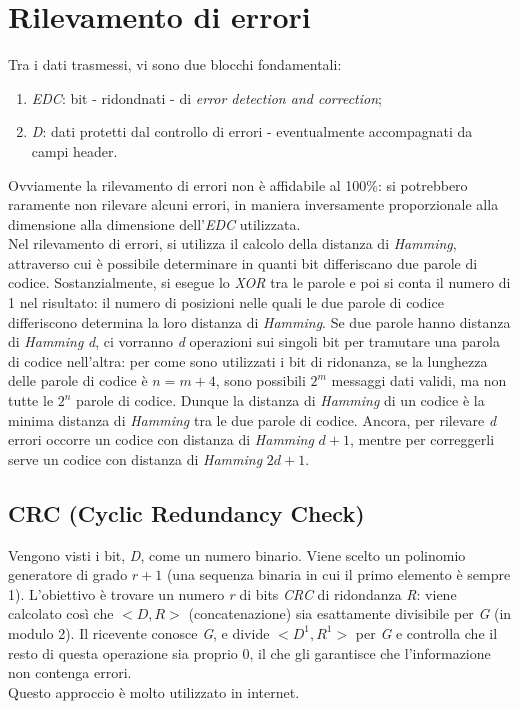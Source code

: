\section{Rilevamento di errori}
Tra i dati trasmessi, vi sono due blocchi fondamentali:
\begin{enumerate}
	\item \textit{EDC}: bit - ridondnati - di \textit{error detection and correction};
	\item \textit{D}: dati protetti dal controllo di errori - eventualmente accompagnati da campi header.
\end{enumerate}
Ovviamente la rilevamento di errori non è affidabile al 100\%: si potrebbero raramente non rilevare alcuni errori, in maniera inversamente proporzionale alla dimensione alla dimensione dell'\textit{EDC} utilizzata. \\
Nel rilevamento di errori, si utilizza il calcolo della distanza di \textit{Hamming}, attraverso cui è possibile determinare in quanti bit differiscano due parole di codice. Sostanzialmente, si esegue lo \textit{XOR} tra le parole e poi si conta il numero di 1 nel risultato: il numero di posizioni nelle quali le due parole di codice differiscono determina la loro distanza di \textit{Hamming}. Se due parole hanno distanza di \textit{Hamming} \textit{d}, ci vorranno \textit{d} operazioni sui singoli bit per tramutare una parola di codice nell'altra: per come sono utilizzati i bit di ridonanza, se la lunghezza delle parole di codice è $n=m+4$, sono possibili $2^m$ messaggi dati validi, ma non tutte le $2^n$ parole di codice. Dunque la distanza di \textit{Hamming} di un codice è la minima distanza di \textit{Hamming} tra le due parole di codice. Ancora, per rilevare \textit{d} errori occorre un codice con distanza di \textit{Hamming} $d+1$, mentre per correggerli serve un codice con distanza di \textit{Hamming} $2d+1$.

\subsection{CRC (Cyclic Redundancy Check)}
Vengono visti i bit, \textit{D}, come un numero binario. Viene scelto un polinomio generatore di grado $r+1$ (una sequenza binaria in cui il primo elemento è sempre 1). L'obiettivo è trovare un numero \textit{r} di bits \textit{CRC} di ridondanza \textit{R}: viene calcolato così che $<D,R>$ (concatenazione) sia esattamente divisibile per \textit{G} (in modulo 2). Il ricevente conosce \textit{G}, e divide $<D^1,R^1>$ per \textit{G} e controlla che il resto di questa operazione sia proprio 0, il che gli garantisce che l'informazione non contenga errori. \\
Questo approccio è molto utilizzato in internet.